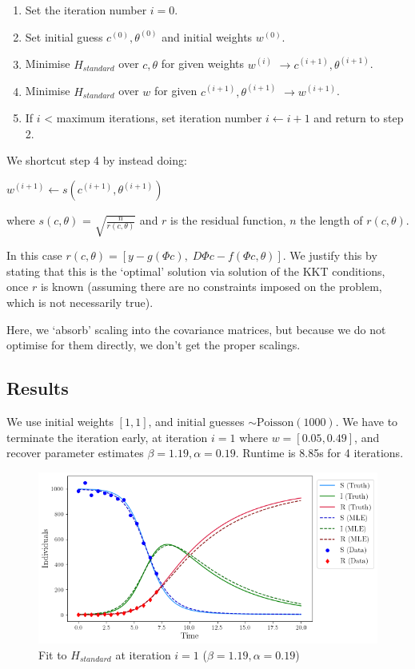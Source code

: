 \begin{enumerate}
\def\labelenumi{\arabic{enumi}.}
\tightlist
\item
  Set the iteration number \(i=0\).
\item
  Set initial guess \(c^{(0)}, \theta^{(0)}\) and initial weights
  \(w^{(0)}\).
\item
  Minimise \(H_{standard}\) over \(c, \theta\) for given weights
  \(w^{(i)}\) \(\to c^{(i+1)}, \theta^{(i+1)}\).
\item
  Minimise \(H_{standard}\) over \(w\) for given
  \(c^{(i+1)}, \theta^{(i+1)}\) \(\to w^{(i+1)}\).
\item
  If \(i\) \textless{} maximum iterations, set iteration number
  \(i \gets i+1\) and return to step 2.
\end{enumerate}

We shortcut step 4 by instead doing:

\(w^{(i+1)} \gets s(c^{(i+1)}, \theta^{(i+1)})\)

where \(s(c, \theta)\) = \(\sqrt{\frac{n}{r(c, \theta)}}\) and \(r\) is
the residual function, \(n\) the length of \(r(c, \theta)\).

In this case
\(r(c, \theta) = \left[y - g(\Phi c), \;D\Phi c - f(\Phi c, \theta)\right]\).
We justify this by stating that this is the `optimal' solution via
solution of the KKT conditions, once \(r\) is known (assuming there are
no constraints imposed on the problem, which is not necessarily true).

Here, we `absorb' scaling into the covariance matrices, but because we
do not optimise for them directly, we don't get the proper scalings.

\hypertarget{results}{%
\subsection{Results}\label{results}}

We use initial weights \([1, 1]\), and initial guesses
\(\sim \text{Poisson}(1000)\). We have to terminate the iteration early,
at iteration \(i=1\) where \(w=[0.05, 0.49]\), and recover parameter
estimates \(\beta = 1.19, \alpha = 0.19\). Runtime is 8.85s for 4
iterations.

\begin{figure}
\centering
\includegraphics{img/standard_fit_iter1.png}
\caption{Fit to \(H_{standard}\) at iteration \(i=1\)
(\(\beta=1.19, \alpha=0.19\))}
\end{figure}

